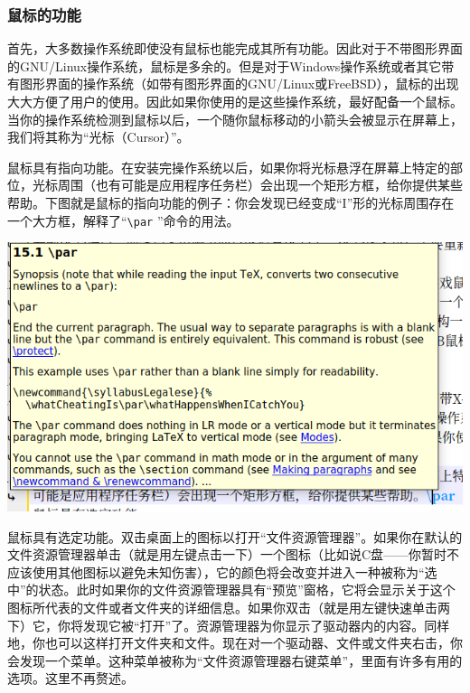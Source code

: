 \subsubsection{鼠标的功能}
首先，大多数操作系统即使没有鼠标也能完成其所有功能。因此对于不带图形界面的GNU/Linux操作系统，鼠标是多余的。但是对于Windows操作系统或者其它带有图形界面的操作系统（如带有图形界面的GNU/Linux或FreeBSD），鼠标的出现大大方便了用户的使用。因此如果你使用的是这些操作系统，最好配备一个鼠标。当你的操作系统检测到鼠标以后，一个随你鼠标移动的小箭头会被显示在屏幕上，我们将其称为“光标（Cursor）”。\par
鼠标具有指向功能。在安装完操作系统以后，如果你将光标悬浮在屏幕上特定的部位，光标周围（也有可能是应用程序任务栏）会出现一个矩形方框，给你提供某些帮助。下图就是鼠标的指向功能的例子：你会发现已经变成“I”形的光标周围存在一个大方框，解释了“\verb|\par| ”命令的用法。
\begin{center}
	\includegraphics{pic/Crusor}
\end{center}\par
鼠标具有选定功能。双击桌面上的图标以打开“文件资源管理器”。如果你在默认的文件资源管理器单击（就是用左键点击一下）一个图标（比如说C盘——你暂时不应该使用其他图标以避免未知伤害），它的颜色将会改变并进入一种被称为“选中”的状态。此时如果你的文件资源管理器具有“预览”窗格，它将会显示关于这个图标所代表的文件或者文件夹的详细信息。如果你双击（就是用左键快速单击两下）它，你将发现它被“打开”了。资源管理器为你显示了驱动器内的内容。同样地，你也可以这样打开文件夹和文件。现在对一个驱动器、文件或文件夹右击，你会发现一个菜单。这种菜单被称为“文件资源管理器右键菜单”，里面有许多有用的选项。这里不再赘述。
